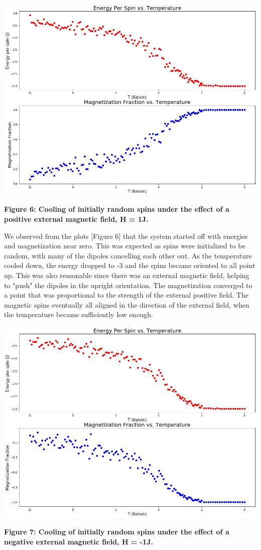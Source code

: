 \documentclass[11pt]{article}
\begin{document}
\begin{center}
    \includegraphics[width = \linewidth]{randomPosField.png}
    \caption{\textbf{Figure 6: Cooling of initially random spins under the effect of a positive external magnetic field, H = 1J.}}
    \label{fig:plt1}
\end{center}

We observed from the plots [Figure 6] that the system started off with energies and magnetization near zero. This was expected as spins were initialized to be random, with many of the dipoles cancelling each other out. As the temperature cooled down, the energy dropped to -3 and the spins became oriented to all point up. This was also reasonable since there was an external magnetic field, helping to "push" the dipoles in the upright orientation. The magnetization converged to a point that was proportional to the strength of the external positive field. The magnetic spins eventually all aligned in the direction of the external field, when the temperature became sufficiently low enough.

\begin{center}
    \includegraphics[width = \linewidth]{randomNegField.png}
    \caption{\textbf{Figure 7: Cooling of initially random spins under the effect of a negative external magnetic field, H = -1J.}}
    \label{fig:plt1}
\end{center}
\end{document}
